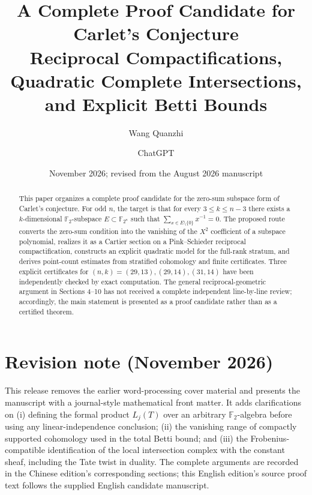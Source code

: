 \documentclass[11pt]{amsart}
\title[A Proof Candidate for Carlet's Conjecture]{A Complete Proof Candidate for Carlet's Conjecture\\[0.4em]\large Reciprocal Compactifications, Quadratic Complete Intersections, and Explicit Betti Bounds}
\author{Wang Quanzhi}
\author{ChatGPT}
\date{November 2026; revised from the August 2026 manuscript}
\begin{document}
\begin{abstract}
This paper organizes a complete proof candidate for the zero-sum subspace form of Carlet's conjecture. For odd $n$, the target is that for every $3\le k\le n-3$ there exists a $k$-dimensional $\mathbb F_2$-subspace $E\subset\mathbb F_{2^n}$ such that $\sum_{x\in E\setminus\{0\}}x^{-1}=0$. The proposed route converts the zero-sum condition into the vanishing of the $X^2$ coefficient of a subspace polynomial, realizes it as a Cartier section on a Pink--Schieder reciprocal compactification, constructs an explicit quadratic model for the full-rank stratum, and derives point-count estimates from stratified cohomology and finite certificates. Three explicit certificates for $(n,k)=(29,13),(29,14),(31,14)$ have been independently checked by exact computation. The general reciprocal-geometric argument in Sections 4--10 has not received a complete independent line-by-line review; accordingly, the main statement is presented as a proof candidate rather than as a certified theorem.
\end{abstract}
\maketitle
\begin{center}\end{center}
\section*{Revision note (November 2026)}
This release removes the earlier word-processing cover material and presents the manuscript with a journal-style mathematical front matter. It adds clarifications on (i) defining the formal product $L_j(T)$ over an arbitrary $\mathbb F_2$-algebra before using any linear-independence conclusion; (ii) the vanishing range of compactly supported cohomology used in the total Betti bound; and (iii) the Frobenius-compatible identification of the local intersection complex with the constant sheaf, including the Tate twist in duality. The complete arguments are recorded in the Chinese edition's corresponding sections; this English edition's source proof text follows the supplied English candidate manuscript.
\end{document}
